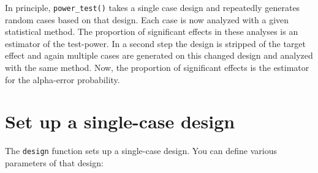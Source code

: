 \documentclass[
]{book}
\begin{document}
In principle, \texttt{power\_test()} takes a single case design and repeatedly generates random cases based on that design. Each case is now analyzed with a given statistical method. The proportion of significant effects in these analyses is an estimator of the test-power. In a second step the design is stripped of the target effect and again multiple cases are generated on this changed design and analyzed with the same method. Now, the proportion of significant effects is the estimator for the alpha-error probability.

\hypertarget{set-up-a-single-case-design}{%
\section{Set up a single-case design}\label{set-up-a-single-case-design}}

The \texttt{design} function sets up a single-case design. You can define various parameters of that design:
\end{document}
